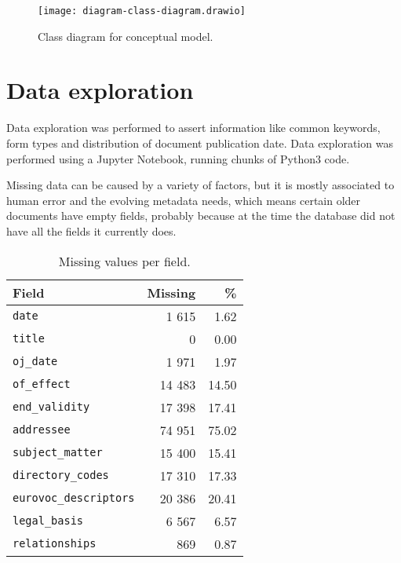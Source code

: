 \documentclass[sigconf, authorversion]{acmart}
\begin{document}
\begin{figure}
  \texttt{[image: diagram-class-diagram.drawio]}
  \caption{Class diagram for conceptual model.}
  \label{fig:class-diagram}
\end{figure}

\section{Data exploration}
\label{sec:data-exploration}

Data exploration was performed to assert information like common keywords, form types and distribution of document publication date. Data exploration was performed using a Jupyter Notebook, running chunks of Python3 code.

Missing data can be caused by a variety of factors, but it is mostly associated to human error and the evolving metadata needs, which means certain older documents have empty fields, probably because at the time the database did not have all the fields it currently does.

\begin{table}[ht]
    \centering
    \caption{Missing values per field.} \label{tab:missing}
    \begin{tabular}{@{}l|r|r@{}}
        \textbf{Field}              & \textbf{Missing}& \textbf{\%} \\ \hline
        \texttt{date}                   & 1 615            & 1.62                    \\
        \texttt{title}                  & 0               & 0.00                    \\
        \texttt{oj\_date}               & 1 971            & 1.97                    \\
        \texttt{of\_effect}             & 14 483           & 14.50                   \\
        \texttt{end\_validity}          & 17 398           & 17.41                   \\
        \texttt{addressee}              & 74 951           & 75.02                   \\
        \texttt{subject\_matter}        & 15 400           & 15.41                   \\
        \texttt{directory\_codes}       & 17 310           & 17.33                   \\
        \texttt{eurovoc\_descriptors}   & 20 386           & 20.41                   \\
        \texttt{legal\_basis}           & 6 567            & 6.57                    \\
        \texttt{relationships}          & 869             & 0.87                    \\
    \end{tabular}
\end{table}
\end{document}
